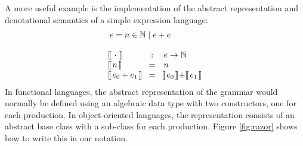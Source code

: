 \documentclass[authoryear,preprint]{sigplanconf}
\newcommand {\lbrac} {\makebox[0pt]{[\kern-1ex[}}
\newcommand {\rbrac} {\makebox[0pt]{]\kern-1ex]}}
\newcommand{\denote}[1]{\lbrac~#1~\rbrac}
\begin{document}
A more useful example is the implementation of the abstract representation and denotational semantics of a simple expression language:
\begin{displaymath}
\begin{array}{lcl}
\multicolumn{3}{l}{e = n \in \mathbb{N} \mid e+e} \\\\

\denote{\cdot} & : & e \to \mathbb{N}\\
\denote{n} & = & n \\
\denote{e_0+e_1} & = & \denote{e_0} + \denote{e_1}
\end{array}
\end{displaymath}
In functional languages, the abstract representation of the grammar would normally be defined using an algebraic data type with two constructors, one for each production. In object-oriented languages, the representation consists of an abstract base class with a sub-class for each production. Figure \ref{fig:razor} shows how to write this in our notation.
\end{document}
